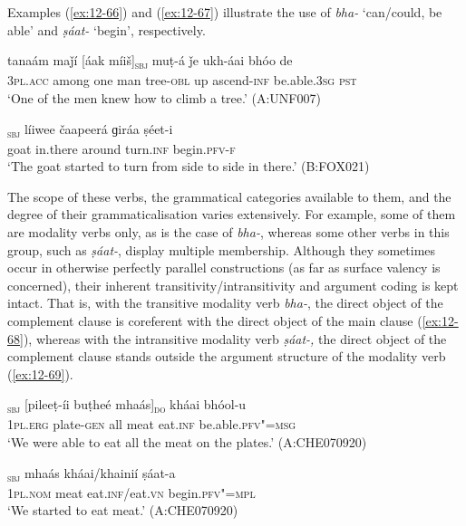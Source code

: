 Examples (\ref{ex:12-66}) and (\ref{ex:12-67}) illustrate the use of \textit{bha-} `can/could, be able' and \textit{ṣáat-} `begin', respectively.
\begin{exe}
\ex
\label{ex:12-66}
\gll tanaám maǰí [áak míiš]\textsubscript{\textsc{sbj}} muṭ-á ǰe ukh-áai bhóo de \\
\textsc{3pl.acc} among one man tree-\textsc{obl} up ascend-\textsc{inf}  be.able.\textsc{3sg} \textsc{pst} \\
\glt `One of the men knew how to climb a tree.' (A:UNF007)
\end{exe}
\begin{exe}
\ex
\label{ex:12-67}
\gll [čhéeli]\textsubscript{\textsc{sbj}} líiwee čaapeerá ɡiráa ṣéet-i \\
goat in.there around turn.\textsc{inf} begin.\textsc{pfv-f} \\
\glt `The goat started to turn from side to side in there.' (B:FOX021)
\end{exe}

The scope of these verbs, the grammatical categories available to them, and the degree of their grammaticalisation varies extensively. For example, some of them are modality verbs only, as is the case of \textit{bha-}, whereas some other verbs in this group, such as \textit{ṣáat-}, display multiple membership. Although they sometimes occur in otherwise perfectly parallel constructions (as far as surface valency is concerned), their inherent transitivity/intransitivity and argument coding is kept intact. That is, with the transitive modality verb \textit{bha-}, the direct object of the complement clause is coreferent with the direct object of the main clause (\ref{ex:12-68}), whereas with the intransitive modality verb \textit{ṣáat-,} the direct object of the complement clause stands outside the argument structure of the modality verb (\ref{ex:12-69}).

\begin{exe}
\ex
\label{ex:12-68}
\gll [asím]\textsubscript{\textsc{sbj}} [pileeṭ-íi buṭheé mhaás]\textsubscript{\textsc{do}} kháai bhóol-u \\
\textsc{1pl.erg} plate-\textsc{gen} all meat eat.\textsc{inf} be.able.\textsc{pfv"=msg} \\
\glt `We were able to eat all the meat on the plates.' (A:CHE070920)
\end{exe}
\begin{exe}
\ex
\label{ex:12-69}
\gll [be]\textsubscript{\textsc{sbj}} mhaás kháai/khainií ṣáat-a \\
\textsc{1pl.nom} meat eat.\textsc{inf}/eat.\textsc{vn} begin.\textsc{pfv"=mpl} \\
\glt `We started to eat meat.' (A:CHE070920)
\end{exe}

